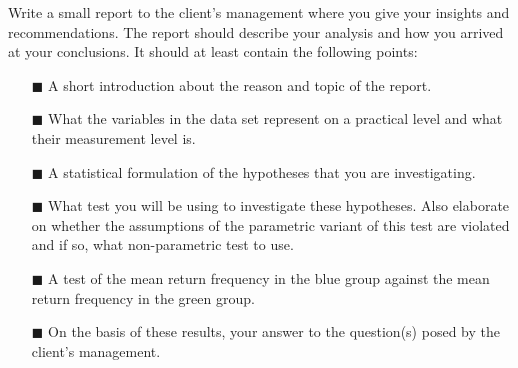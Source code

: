 Write a small report to the client's management where you give your insights and recommendations. The report should describe your analysis and how you arrived at your conclusions. It should at least contain the following points: \\

\begin{itemize}
    \item[$\blacksquare$] A short introduction about the reason and topic of the report.
    \item[$\blacksquare$] What the variables in the data set represent on a practical level and what their measurement level is. 
    \item[$\blacksquare$] A statistical formulation of the hypotheses that you are investigating.
    \item[$\blacksquare$] What test you will be using to investigate these hypotheses. Also elaborate on whether the assumptions of the parametric variant of this test are violated and if so, what non-parametric test to use.
    \item[$\blacksquare$] A test of the mean return frequency in the blue group against the mean return frequency in the green group.
    \item[$\blacksquare$] On the basis of these results, your answer to the question(s) posed by the client's management.
\end{itemize}

\clearpage %